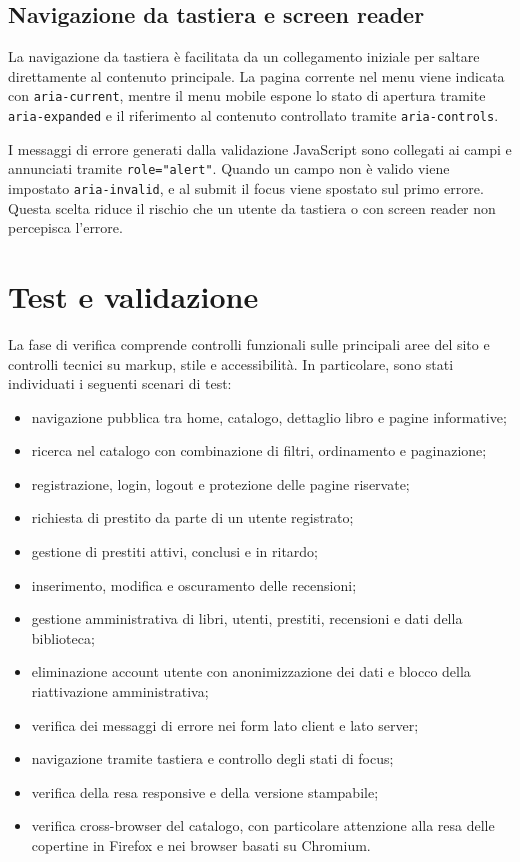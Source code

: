 ﻿\documentclass{article}
\begin{document}
\subsection{Navigazione da tastiera e screen reader}
La navigazione da tastiera è facilitata da un collegamento iniziale per saltare direttamente al contenuto principale. La pagina corrente nel menu viene indicata con \texttt{aria-current}, mentre il menu mobile espone lo stato di apertura tramite \texttt{aria-expanded} e il riferimento al contenuto controllato tramite \texttt{aria-controls}.

I messaggi di errore generati dalla validazione JavaScript sono collegati ai campi e annunciati tramite \texttt{role="alert"}. Quando un campo non è valido viene impostato \texttt{aria-invalid}, e al submit il focus viene spostato sul primo errore. Questa scelta riduce il rischio che un utente da tastiera o con screen reader non percepisca l'errore.

\newpage

\section{Test e validazione}
La fase di verifica comprende controlli funzionali sulle principali aree del sito e controlli tecnici su markup, stile e accessibilità. In particolare, sono stati individuati i seguenti scenari di test:

\begin{itemize}
    \item navigazione pubblica tra home, catalogo, dettaglio libro e pagine informative;
    \item ricerca nel catalogo con combinazione di filtri, ordinamento e paginazione;
    \item registrazione, login, logout e protezione delle pagine riservate;
    \item richiesta di prestito da parte di un utente registrato;
    \item gestione di prestiti attivi, conclusi e in ritardo;
    \item inserimento, modifica e oscuramento delle recensioni;
    \item gestione amministrativa di libri, utenti, prestiti, recensioni e dati della biblioteca;
    \item eliminazione account utente con anonimizzazione dei dati e blocco della riattivazione amministrativa;
    \item verifica dei messaggi di errore nei form lato client e lato server;
    \item navigazione tramite tastiera e controllo degli stati di focus;
    \item verifica della resa responsive e della versione stampabile;
    \item verifica cross-browser del catalogo, con particolare attenzione alla resa delle copertine in Firefox e nei browser basati su Chromium.
\end{itemize}
\end{document}
